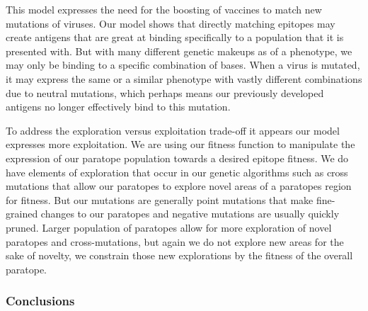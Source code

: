 \documentclass[conference]{IEEEtran}
\begin{document}
This model expresses the need for the boosting of vaccines to match new mutations of viruses. Our model shows that directly matching epitopes may create antigens that are great at binding specifically to a population that it is presented with. But with many different genetic makeups as of a phenotype, we may only be binding to a specific combination of bases. When a virus is mutated, it may express the same or a similar phenotype with vastly different combinations due to neutral mutations, which perhaps means our previously developed antigens no longer effectively bind to this mutation. 

To address the exploration versus exploitation trade-off it appears our model expresses more exploitation. We are using our fitness function to manipulate the expression of our paratope population towards a desired epitope fitness. We do have elements of exploration that occur in our genetic algorithms such as cross mutations that allow our paratopes to explore novel areas of a paratopes region for fitness. But our mutations are generally point mutations that make fine-grained changes to our paratopes and negative mutations are usually quickly pruned. Larger population of paratopes allow for more exploration of novel paratopes and cross-mutations, but again we do not explore new areas for the sake of novelty, we constrain those new explorations by the fitness of the overall paratope.

\subsubsection{Conclusions}
\end{document}
